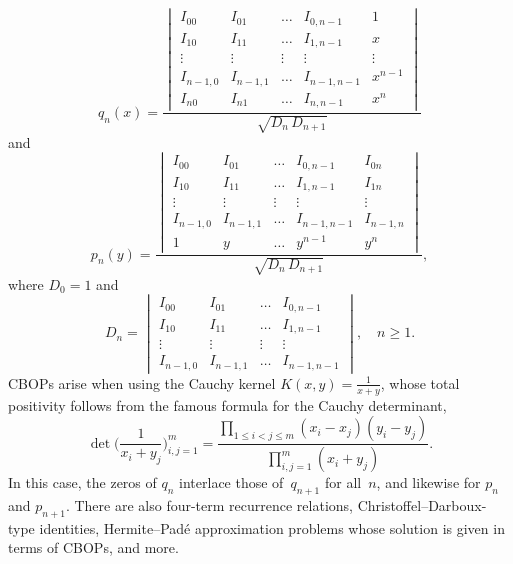 \documentclass[10pt,a4paper]{article} \pdfoutput=1 
\begin{document}
\begin{remark}
  \begin{equation}
    q_n(x) =
    \frac{
      \begin{vmatrix}
        I_{00} & I_{01} & \dots & I_{0,n-1} & 1 \\
        I_{10} & I_{11} & \dots & I_{1,n-1} & x \\
        \vdots & \vdots & \vdots & \vdots & \vdots \\
        I_{n-1,0} & I_{n-1,1} & \dots & I_{n-1,n-1} & x^{n-1} \\
        I_{n0} & I_{n1}  & \dots & I_{n,n-1} & x^n
      \end{vmatrix}
    }{\sqrt{ D_{n} \, D_{n+1} }}
  \end{equation}
  and
  \begin{equation}
    p_n(y) =
    \frac{
      \begin{vmatrix}
        I_{00} & I_{01} & \dots & I_{0,n-1} & I_{0n} \\
        I_{10} & I_{11} & \dots & I_{1,n-1} & I_{1n} \\
        \vdots & \vdots & \vdots & \vdots & \vdots \\
        I_{n-1,0} & I_{n-1,1} & \dots & I_{n-1,n-1} & I_{n-1,n} \\
        1 & y  & \dots & y^{n-1} & y^n
      \end{vmatrix}
    }{\sqrt{ D_{n} \, D_{n+1} }}
    ,
  \end{equation}
  where $D_0 = 1$ and
  \begin{equation}
    D_n =
    \begin{vmatrix}
      I_{00} & I_{01} & \dots & I_{0,n-1} \\
      I_{10} & I_{11} & \dots & I_{1,n-1} \\
      \vdots & \vdots & \vdots & \vdots  \\
      I_{n-1,0} & I_{n-1,1} & \dots & I_{n-1,n-1}
    \end{vmatrix}
    , \quad
    n \ge 1
    .
  \end{equation}
  CBOPs arise when using the Cauchy kernel
  $K(x,y)=\frac{1}{x+y}$,
  whose total positivity follows from the famous formula for the Cauchy determinant,
  \begin{equation*}
    \det \biggl( \frac{1}{x_i + y_j} \biggr)_{i,j=1}^m
    = \frac{\prod_{1 \le i < j \le m} (x_i-x_j) (y_i-y_j)}{\prod_{i,j=1}^m (x_i+y_j)}
    .
  \end{equation*}
  In this case, the zeros of $q_n$ interlace those of~$q_{n+1}$ for all~$n$,
  and likewise for $p_n$ and $p_{n+1}$.
  There are also four-term recurrence relations, Christoffel--Darboux-type identities,
  Hermite--Padé approximation problems whose solution is given in terms of CBOPs,
  and more.
\end{remark}
\end{document}
